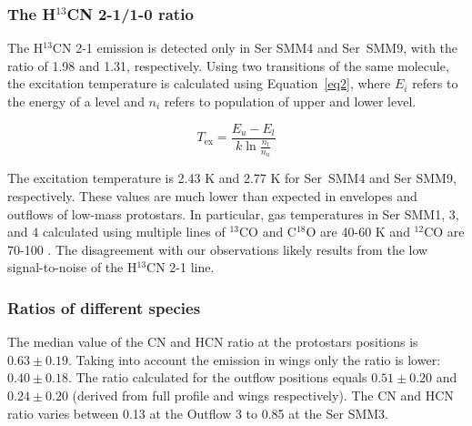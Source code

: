 \documentclass{aa}
\begin{document}

\subsubsection{The H$^{13}$CN 2-1/1-0 ratio}
\label{subsection:temperature}

The H$^{13}$CN 2-1 emission is detected only in Ser SMM4 and Ser~SMM9, with the ratio of 1.98 and 1.31, respectively.
Using two transitions of the same molecule, the excitation temperature is calculated using Equation~\ref{eq2}, where $E_i$ refers to the energy of a level
and $n_i$ refers to population of upper and lower level.

\begin{equation} 
\label{eq2} 
T_{\mathrm{ex}} = \frac{E_u - E_l}{k \ln \frac{n_l}{n_u}} 
\end{equation}

The excitation temperature is 2.43 K and 2.77 K for Ser~SMM4 and Ser SMM9, respectively. 
These values are much lower than expected in envelopes and outflows of low-mass protostars. In particular,
gas temperatures in Ser SMM1, 3, and 4 calculated using multiple lines of $^{13}$CO and C$^{18}$O are 40-60 K 
and $^{12}$CO are 70-100 \citep{Yil12,Yil13}. The disagreement with our observations likely 
results from the low signal-to-noise of the H$^{13}$CN 2-1 line. 

\subsubsection{Ratios of different species}
\label{subsection:statistics}

The median value of the CN and HCN ratio at the protostars positions is $0.63 \pm 0.19$. Taking into account the emission in wings only the ratio is lower: $0.40 \pm 0.18$. The ratio calculated for the outflow positions equals $0.51 \pm 0.20$ and $0.24 \pm 0.20$ (derived from full profile and wings respectively). 
The CN and HCN ratio varies between 0.13 at the Outflow 3 to 0.85 at the Ser SMM3. 
\end{document}
